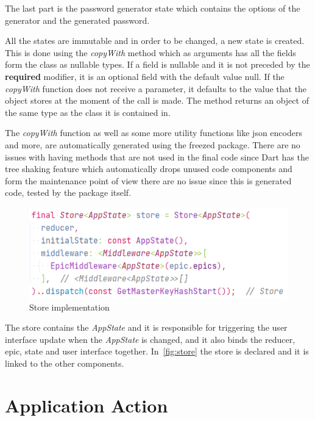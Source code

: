 \documentclass[a4paper,12pt]{report}
\begin{document}
The last part is the password generator state which contains the options of the
generator and the generated password.

All the states are immutable and in order to be changed, a new state is
created. This is done using the \textit{copyWith} method which as arguments has
all the fields form the class as nullable types. If a field is nullable and it
is not preceded by the \textbf{required} modifier, it is an optional field with
the default value null. If the \textit{copyWith} function does not receive a
parameter, it defaults to the value that the object stores at the moment of the
call is made. The method returns an object of the same type as the class it is
contained in.

The \textit{copyWith} function as well as some more utility functions like json
encoders and more, are automatically generated using the
freezed\cite{freezedDocs} package. There are no issues with having methods that
are not used in the final code since Dart has the tree shaking feature which
automatically drops unused code components and form the maintenance point of
view there are no issue since this is generated code, tested by the package
itself.

\begin{figure}[H]
    \centering
    \includegraphics[scale=0.6]{images/code/store.png}
    \caption{Store implementation}\label{fig:store}
\end{figure}

The store contains the \textit{AppState} and it is responsible for triggering
the user interface update when the \textit{AppState} is changed, and it also
binds the reducer, epic, state and user interface together.
In~\autoref{fig:store} the store is declared and it is linked to the other
components.

\section{Application Action}
\end{document}
